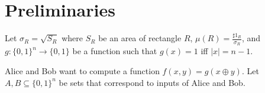 \section{Preliminaries}

Let $\sigma_{R} = \sqrt{S_R}$ where $S_R$ be an area of rectangle $R$,
$\mu(R) = \frac{\sharp 1_R}{\sigma_R}$, and $g: \{0, 1\}^n \to \{0, 1\}$ be a function such that $g(x) =
1$ iff $|x| = n - 1$.

Alice and Bob want to compute a function $f(x, y) = g(x \oplus y)$. Let $A, B \subseteq \{0, 1\}^{n}$ be
sets that correspond to inputs of Alice and Bob.
